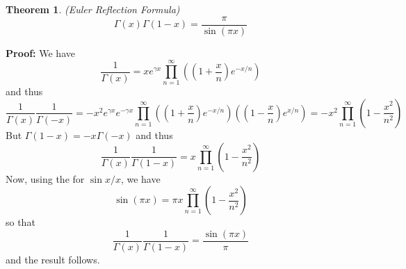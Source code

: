 \documentclass[12pt]{article}
\newtheorem{thm}{Theorem}
\begin{document}
\begin{thm} (Euler Reflection Formula)
\[\Gamma(x)\Gamma(1-x)=\frac{\pi}{\sin(\pi x)}\]
\end{thm}

\textbf{Proof:}
We have
\[\frac{1}{\Gamma(x)}=xe^{\gamma x}\prod_{n=1}^{\infty} \left(\left(1+\frac{x}{n}\right)e^{-x/n}\right)\]
and thus
\[\frac{1}{\Gamma(x)}\frac{1}{\Gamma(-x)}=-x^2e^{\gamma x}e^{-\gamma x}\prod_{n=1}^{\infty}
\left(\left(1+\frac{x}{n}\right)e^{-x/n}\right)\left(\left(1-\frac{x}{n}\right)e^{x/n}\right)=-x^2\prod_{n=1}^{\infty}\left(1-\frac{x^2}{n^2}\right)\]
But $\Gamma(1-x)=-x\Gamma(-x)$ and thus
\[\frac{1}{\Gamma(x)}\frac{1}{\Gamma(1-x)}=x\prod_{n=1}^{\infty}\left(1-\frac{x^2}{n^2}\right)\]
Now, using the  for $\sin x/x$, we have
\[\sin(\pi x)=\pi x\prod_{n=1}^{\infty}\left(1-\frac{x^2}{n^2}\right)\]
so that
\[\frac{1}{\Gamma(x)}\frac{1}{\Gamma(1-x)}=\frac{\sin(\pi x)}{\pi}\]
and the result follows.

\end{document}
